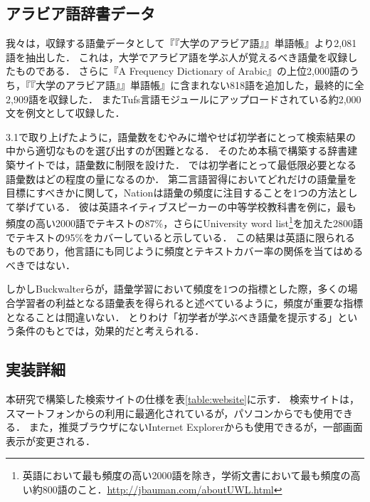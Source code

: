 \documentclass[technicalreport]{ieicej}
\begin{document}
\subsection{アラビア語辞書データ}
我々は，収録する語彙データとして『『大学のアラビア語』』単語帳』\cite{aoyama2015}より2,081語を抽出した．
これは，大学でアラビア語を学ぶ人が覚えるべき語彙を収録したものである．
さらに『A Frequency Dictionary of Arabic』の上位2,000語のうち，『『大学のアラビア語』』単語帳』に含まれない818語を追加した，最終的に全2,909語を収録した．
またTufs言語モジュール\cite{kawaguchi2007}にアップロードされている約2,000文を例文として収録した．

3.1で取り上げたように，語彙数をむやみに増やせば初学者にとって検索結果の中から適切なものを選び出すのが困難となる．
そのため本稿で構築する辞書建築サイトでは，語彙数に制限を設けた．
では初学者にとって最低限必要となる語彙数はどの程度の量になるのか．
第二言語習得においてどれだけの語彙量を目標にすべきかに関して，Nation\cite{nation1990}は語彙の頻度に注目することを1つの方法として挙げている．
彼は英語ネイティブスピーカーの中等学校教科書を例に，最も頻度の高い2000語でテキストの87\%，さらにUniversity word list\footnote{英語において最も頻度の高い2000語を除き，学術文書において最も頻度の高い約800語のこと．\url{http://jbauman.com/aboutUWL.html}}を加えた2800語でテキストの95\%をカバーしていると示している．
この結果は英語に限られるものであり，他言語にも同じように頻度とテキストカバー率の関係を当てはめるべきではない．

しかしBuckwalterら\cite{buckwalter2009}が，語彙学習において頻度を1つの指標とした際，多くの場合学習者の利益となる語彙表を得られると述べているように，頻度が重要な指標となることは間違いない．
とりわけ「初学者が学ぶべき語彙を提示する」という条件のもとでは，効果的だと考えられる．

\subsection{実装詳細}
本研究で構築した検索サイトの仕様を表\ref{table:website}に示す．
検索サイトは，スマートフォンからの利用に最適化されているが，パソコンからでも使用できる．
また，推奨ブラウザにないInternet Explorerからも使用できるが，一部画面表示が変更される．
\end{document}
